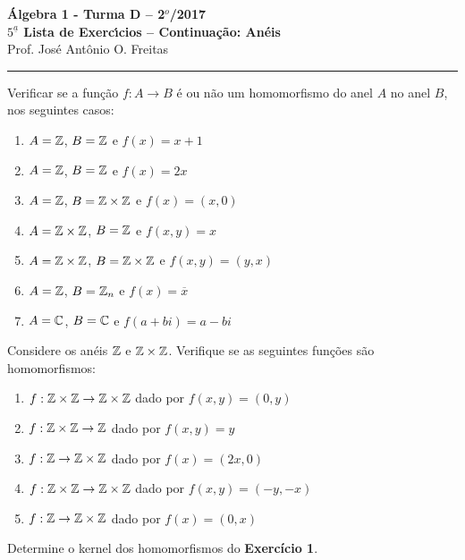 \documentclass[12pt]{article}
\begin{document}


\begin{center}
 {\Large\bf {\'A}lgebra 1 - Turma D -- 2$^{o}$/2017} \\
 \vspace{9pt} {\large\bf $5^{\underline{a}}$ Lista de Exerc{\'\i}cios -- Continuação: An\'eis}\\
 \vspace{9pt} Prof. Jos{\'e} Ant{\^o}nio O. Freitas
\end{center}
\hrule

\vspace{.6cm}

\questao Verificar se a função $f : A \to B$ é ou não um homomorfismo do anel $A$ no anel $B$, nos seguintes casos:
\begin{enumerate}[label=({\alph*})]
\item $A = \mathbb{Z}$, $B = \mathbb{Z}$ e $f(x) = x + 1$
\item $A = \mathbb{Z}$, $B = \mathbb{Z}$ e $f(x) = 2x$
\item $A = \mathbb{Z}$, $B = \mathbb{Z} \times \mathbb{Z}$ e $f(x) = (x, 0)$
\item $A = \mathbb{Z} \times \mathbb{Z}$, $B = \mathbb{Z}$ e $f(x,y) = x$
\item $A = \mathbb{Z} \times \mathbb{Z}$, $B = \mathbb{Z} \times \mathbb{Z}$ e $f(x,y) = (y,x)$
\item $A = \mathbb{Z}$, $B = \mathbb{Z}_n$ e $f(x) = \overline{x}$
\item $A = \mathbb{C}$, $B = \mathbb{C}$ e $f(a + bi) = a - bi$
\end{enumerate}

\vesp

\questao  Considere os an{\'e}is $\mathbb{Z}$ e $\mathbb{Z}\times \mathbb{Z}$. Verifique se as seguintes funções s{\~a}o homomorfismos:
\begin{enumerate}[label=({\alph*})]
\item $f : \mathbb{Z}\times\mathbb{Z} \to \mathbb{Z}\times\mathbb{Z}$ dado por $f(x,y) = (0,y)$
\item $f : \mathbb{Z}\times\mathbb{Z} \to \mathbb{Z}$ dado por $f(x,y) = y$
\item $f : \mathbb{Z}\to \mathbb{Z}\times\mathbb{Z}$ dado por $f(x) = (2x,0)$
\item $f : \mathbb{Z}\times\mathbb{Z} \to \mathbb{Z}\times\mathbb{Z}$ dado por $f(x,y) = (-y,-x)$
\item $f : \mathbb{Z} \to \mathbb{Z}\times\mathbb{Z}$ dado por $f(x) = (0,x)$
\end{enumerate}

\vesp

\questao Determine o kernel dos homomorfismos do \textbf{Exerc{\'i}cio 1}.
\end{document}

